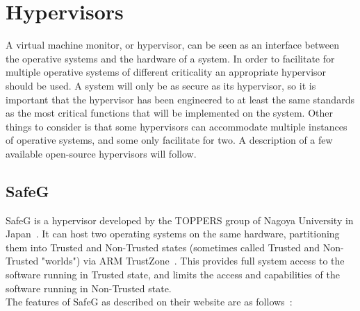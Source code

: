 \section{Hypervisors}
A virtual machine monitor, or hypervisor, can be seen as an interface between the operative systems and the hardware of a system. In order to facilitate for multiple operative systems of different criticality an appropriate hypervisor should be used. A system will only be as secure as its hypervisor, so it is important that the hypervisor has been engineered to at least the same standards as the most critical functions that will be implemented on the system. Other things to consider is that some hypervisors can accommodate multiple instances of operative systems, and some only facilitate for two. A description of a few available open-source hypervisors will follow.

\subsection{SafeG}
\label{sec:safeg}
SafeG is a hypervisor developed by the TOPPERS group of Nagoya University in Japan~\cite{website:safeg}. It can host two operating systems on the same hardware, partitioning them into Trusted and Non-Trusted states (sometimes called Trusted and Non-Trusted "worlds") via ARM TrustZone~\cite{website:ARM}. This provides full system access to the software running in Trusted state, and limits the access and capabilities of the software running in Non-Trusted state.\\

The features of SafeG as described on their website are as follows~\cite{website:safeg}:

